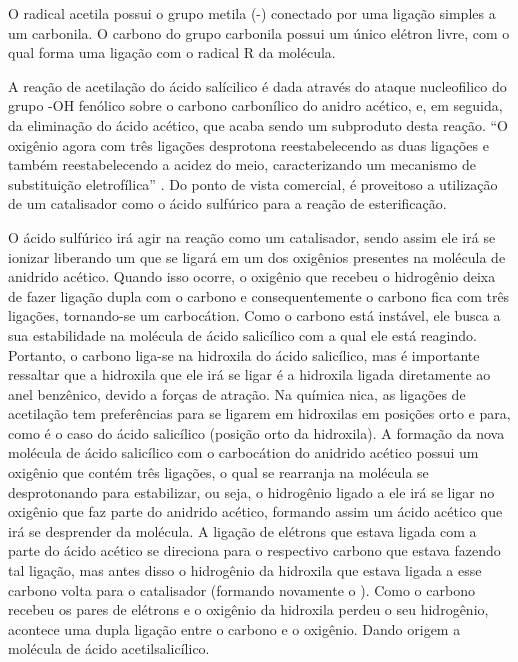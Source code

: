 O radical acetila possui o grupo metila (-) conectado por uma ligação simples a um carbonila. O
carbono do grupo carbonila possui um único elétron livre, com o qual forma uma ligação com o radical R da
molécula.

A reação de acetilação do ácido salícilico é dada através do ataque nucleofilico do grupo -OH fenólico
sobre o carbono carbonílico do anidro acético, e, em seguida, da eliminação do ácido acético, que acaba
sendo um subproduto desta reação. “O oxigênio agora com três ligações desprotona reestabelecendo as duas
ligações e também reestabelecendo a acidez do meio, caracterizando um mecanismo de substituição
eletrofílica” \cite{lopes2011}. Do ponto de vista comercial, é proveitoso a utilização de um catalisador
como o ácido sulfúrico para a reação de esterificação. \cite{PERUCH2013}

O ácido sulfúrico irá agir na reação como um catalisador, sendo assim ele irá se ionizar liberando
um  que se ligará em um dos oxigênios presentes na molécula de anidrido acético. Quando isso
ocorre, o oxigênio que recebeu o hidrogênio deixa de fazer ligação dupla com o carbono e
consequentemente o carbono fica com três ligações, tornando-se um carbocátion. Como o carbono está
instável, ele busca a sua estabilidade na molécula de ácido salicílico com a qual ele está reagindo.
Portanto, o carbono liga-se na hidroxila do ácido salicílico, mas é importante ressaltar que a
hidroxila que ele irá se ligar é a hidroxila ligada diretamente ao anel benzênico, devido a forças
de atração. Na química nica, as ligações de acetilação tem preferências para se ligarem em
hidroxilas em posições orto e para, como é o caso do ácido salicílico (posição orto da hidroxila). A
formação da nova molécula de ácido salicílico com o carbocátion do anidrido acético possui um
oxigênio que contém três ligações, o qual se rearranja na molécula se desprotonando para
estabilizar, ou seja, o hidrogênio ligado a ele irá se ligar no oxigênio que faz parte do anidrido
acético, formando assim um ácido acético que irá se desprender da molécula. A ligação de elétrons
que estava ligada com a parte do ácido acético se direciona para o respectivo carbono que estava
fazendo tal ligação, mas antes disso o hidrogênio da hidroxila que estava ligada a esse carbono
volta para o catalisador (formando novamente o ). Como o carbono recebeu os pares de elétrons e
o oxigênio da hidroxila perdeu o seu hidrogênio, acontece uma dupla ligação entre o carbono e o
oxigênio. Dando origem a molécula de ácido acetilsalicílico.

